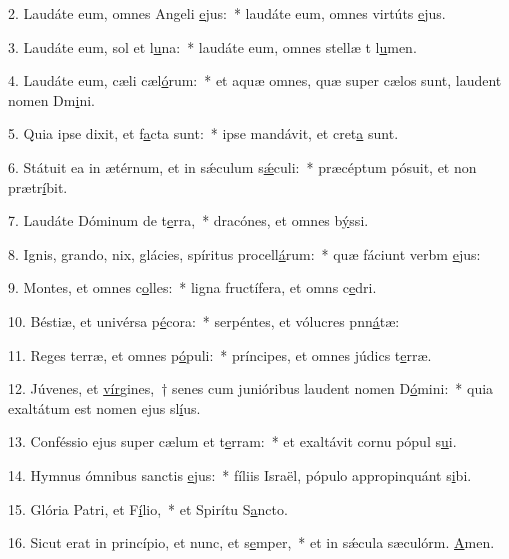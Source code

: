 2. Laudáte eum, omnes Angeli \uline{e}jus:~* laudáte eum, omnes virtúts \uline{e}jus.\par 
3. Laudáte eum, sol et l\uline{u}na:~* laudáte eum, omnes stellæ t l\uline{u}men.\par 
4. Laudáte eum, cæli cæl\uline{ó}rum:~* et aquæ omnes, quæ super cælos sunt, laudent nomen Dm\uline{i}ni.\par 
5. Quia ipse dixit, et f\uline{a}cta sunt:~* ipse mandávit, et cret\uline{a} sunt.\par 
6. Státuit ea in ætérnum, et in sǽculum s\uline{ǽ}culi:~* præcéptum pósuit, et non prætr\uline{í}bit.\par 
7. Laudáte Dóminum de t\uline{e}rra,~* dracónes, et omnes b\uline{ý}ssi.\par 
8. Ignis, grando, nix, glácies, spíritus procell\uline{á}rum:~* quæ fáciunt verbm \uline{e}jus:\par 
9. Montes, et omnes c\uline{o}lles:~* ligna fructífera, et omns c\uline{e}dri.\par 
10. Béstiæ, et univérsa p\uline{é}cora:~* serpéntes, et vólucres pnn\uline{á}tæ:\par 
11. Reges terræ, et omnes p\uline{ó}puli:~* príncipes, et omnes júdics t\uline{e}rræ.\par 
12. Júvenes, et \uline{vír}gines,~† senes cum junióribus laudent nomen D\uline{ó}mini:~* quia exaltátum est nomen ejus sl\uline{í}us.\par 
13. Conféssio ejus super cælum et t\uline{e}rram:~* et exaltávit cornu pópul s\uline{u}i.\par 
14. Hymnus ómnibus sanctis \uline{e}jus:~* fíliis Israël, pópulo appropinquánt s\uline{i}bi.\par 
15. Glória Patri, et F\uline{í}lio,~* et Spirítu S\uline{a}ncto.\par 
16. Sicut erat in princípio, et nunc, et s\uline{e}mper,~* et in sǽcula sæculórm. \uline{A}men.\par 
